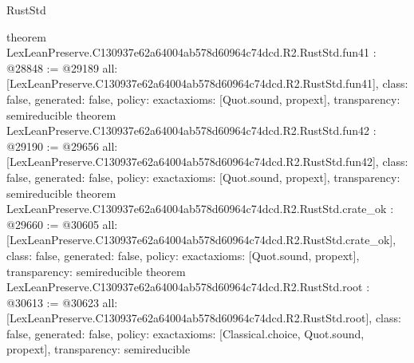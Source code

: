 \begin{lexlean}{RustStd}
\begin{coremodule}
{}
theorem LexLeanPreserve.C130937e62a64004ab578d60964c74dcd.R2.RustStd.fun41 : @28848 := @29189 {
  all: [LexLeanPreserve.C130937e62a64004ab578d60964c74dcd.R2.RustStd.fun41],
  class: false,
  generated: false,
  policy: exact{axioms: [Quot.sound, propext]},
  transparency: semireducible
}
theorem LexLeanPreserve.C130937e62a64004ab578d60964c74dcd.R2.RustStd.fun42 : @29190 := @29656 {
  all: [LexLeanPreserve.C130937e62a64004ab578d60964c74dcd.R2.RustStd.fun42],
  class: false,
  generated: false,
  policy: exact{axioms: [Quot.sound, propext]},
  transparency: semireducible
}
theorem LexLeanPreserve.C130937e62a64004ab578d60964c74dcd.R2.RustStd.crate_ok : @29660 := @30605 {
  all: [LexLeanPreserve.C130937e62a64004ab578d60964c74dcd.R2.RustStd.crate_ok],
  class: false,
  generated: false,
  policy: exact{axioms: [Quot.sound, propext]},
  transparency: semireducible
}
theorem LexLeanPreserve.C130937e62a64004ab578d60964c74dcd.R2.RustStd.root : @30613 := @30623 {
  all: [LexLeanPreserve.C130937e62a64004ab578d60964c74dcd.R2.RustStd.root],
  class: false,
  generated: false,
  policy: exact{axioms: [Classical.choice, Quot.sound, propext]},
  transparency: semireducible
}


\end{coremodule}
\end{lexlean}
